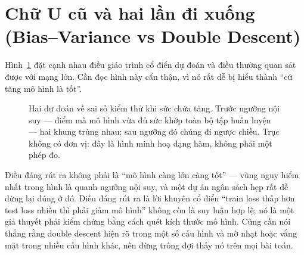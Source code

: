 \documentclass[../../deep_learning.tex]{subfiles}
\begin{document}
\section{Chữ U cũ và hai lần đi xuống (Bias--Variance vs Double Descent)}
Hình~\ref{fig:double-descent} đặt cạnh nhau điều giáo trình cổ điển dự đoán và điều thường quan sát được với mạng lớn. Cần đọc hình này cẩn thận, vì nó rất dễ bị hiểu thành ``cứ tăng mô hình là tốt''.

\begin{figure}[H]\centering
{}
\caption{Hai dự đoán về sai số kiểm thử khi sức chứa tăng. Trước ngưỡng nội suy --- điểm mà mô hình vừa đủ sức khớp toàn bộ tập huấn luyện --- hai khung trùng nhau; sau ngưỡng đó chúng đi ngược chiều. Trục không có đơn vị: đây là hình minh hoạ dạng hàm, không phải một phép đo.}
\label{fig:double-descent}
\end{figure}

Điều đáng rút ra không phải là ``mô hình càng lớn càng tốt'' --- vùng nguy hiểm nhất trong hình là quanh ngưỡng nội suy, và một dự án ngân sách hẹp rất dễ dừng lại đúng ở đó. Điều đáng rút ra là lời khuyên cổ điển ``train loss thấp hơn test loss nhiều thì phải giảm mô hình'' không còn là suy luận hợp lệ; nó là một giả thuyết phải kiểm chứng bằng cách quét kích thước mô hình. Cũng cần nói thẳng rằng double descent hiện rõ trong một số cấu hình và mờ nhạt hoặc vắng mặt trong nhiều cấu hình khác, nên đừng trông đợi thấy nó trên mọi bài toán.
\end{document}
